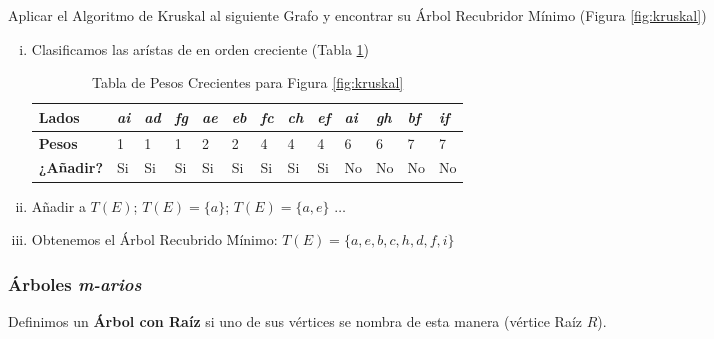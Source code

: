 \ejem Aplicar el Algoritmo de Kruskal al siguiente Grafo y encontrar su Árbol Recubridor Mínimo (Figura \ref{fig:kruskal})

\begin{enumerate}[i.]

\item Clasificamos las arístas de en orden creciente (Tabla \ref{tab:tabKruskal})

\begin{table}[h]

\begin{center}

\begin{tabular}{|l|l|l|l|l|l|l|l|l|l|l|l|l|}\hline
\textbf{Lados} & \textit{ai} & \textit{ad} & \textit{fg} & \textit{ae} & \textit{eb} & \textit{fc} & \textit{ch} & \textit{ef} & \textit{ai} & \textit{gh} & \textit{bf} & \textit{if} \\ \hline
\hline
\textbf{Pesos} & 1 & 1 & 1 & 2 & 2 & 4 & 4 & 4 & 6 & 6 & 7 & 7\\ \hline
\textbf{¿Añadir?} & Si & Si & Si & Si & Si & Si & Si & Si & No & No & No & No\\ \hline
\end{tabular}

\caption{Tabla de Pesos Crecientes para Figura \ref{fig:kruskal}}\label{tab:tabKruskal}


\end{center}

\end{table}

\item Añadir a $T(E)$; $T(E) = \{a\}$; $T(E) = \{a,e\}$ $\dots$

\item Obtenemos el Árbol Recubrido Ḿínimo: $T(E) = \{a,e,b,c,h,d,f,i\}$

\end{enumerate}


\subsubsection{Árboles \textit{m-arios}}
\label{subsec:mTrees}

 Definimos un \textbf{Árbol con Raíz} si uno de sus vértices se nombra 
de esta manera (vértice Raíz $R$).




